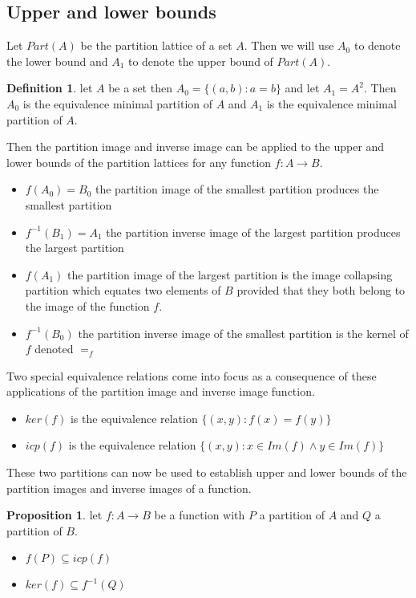 \documentclass[a4paper,11pt, notitlepage]{report}
\theoremstyle{definition}
\newtheorem{definition}{Definition}[section]
\newtheorem{proposition}{Proposition}[section]
\begin{document}
\newpage

\subsection{Upper and lower bounds}
Let $Part(A)$ be the partition lattice of a set $A$. Then we will use $A_0$ to denote the lower bound and $A_1$ to denote the upper bound of $Part(A)$.

\begin{definition}
let $A$ be a set then $A_0 = \{(a,b) : a = b\}$ and let $A_1 = A^2$. Then $A_0$ is the equivalence minimal partition of $A$ and $A_1$ is the equivalence minimal partition of $A$.
\end{definition}

Then the partition image and inverse image can be applied to the upper and lower bounds of the partition lattices for any function $f: A \to B$.

\begin{itemize}
 \item $f(A_0) = B_0$ the partition image of the smallest partition produces the smallest partition
 \item $f^{-1}(B_1) = A_1$ the partition inverse image of the largest partition produces the largest partition
 \item $f(A_1)$ the partition image of the largest partition is the image collapsing partition which equates two elements of $B$ provided that they both belong to the image of the function $f$.
 \item $f^{-1}(B_0)$ the partition inverse image of the smallest partition is the kernel of $f$ denoted $=_f$
\end{itemize}

Two special equivalence relations come into focus as a consequence of these applications of the partition image and inverse image function.

\begin{itemize}
 \item $ker(f)$ is the equivalence relation $\{(x,y): f(x) = f(y)\}$
 \item $icp(f)$ is the equivalence relation $\{(x,y) : x \in Im(f) \land y \in Im(f)\}$
\end{itemize}

These two partitions can now be used to establish upper and lower bounds of the partition images and inverse images of a function.

\begin{proposition}
let $f: A \to B$ be a function with $P$ a partition of $A$ and $Q$ a partition of $B$.

\begin{itemize}
 \item $f(P) \subseteq icp(f)$
 \item $ker(f) \subseteq f^{-1}(Q)$
\end{itemize}
\end{proposition}
\end{document}
